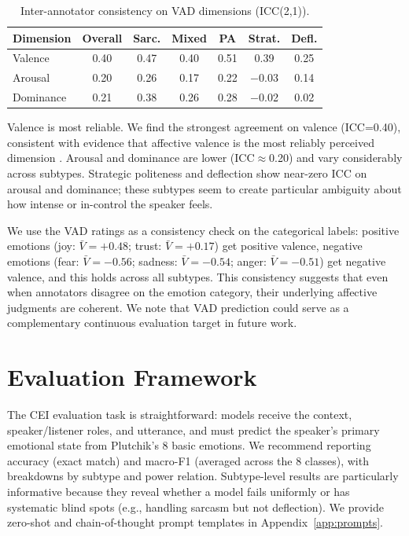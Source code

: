 \documentclass[twoside,11pt]{article}
\begin{document}
\begin{table}[t]
\centering
\caption{Inter-annotator consistency on VAD dimensions (ICC(2,1)).}
\label{tab:vad-icc}
\small
\begin{tabular}{@{}lcccccc@{}}
\toprule
\textbf{Dimension} & \textbf{Overall} & \textbf{Sarc.} & \textbf{Mixed} & \textbf{PA} & \textbf{Strat.} & \textbf{Defl.} \\
\midrule
Valence & 0.40 & 0.47 & 0.40 & 0.51 & 0.39 & 0.25 \\
Arousal & 0.20 & 0.26 & 0.17 & 0.22 & $-$0.03 & 0.14 \\
Dominance & 0.21 & 0.38 & 0.26 & 0.28 & $-$0.02 & 0.02 \\
\bottomrule
\end{tabular}
\end{table}

Valence is most reliable. We find the strongest agreement on valence (ICC=0.40), consistent with evidence that affective valence is the most reliably perceived dimension \citep{russell1980circumplex,warriner2013norms}. Arousal and dominance are lower (ICC$\approx$0.20) and vary considerably across subtypes. Strategic politeness and deflection show near-zero ICC on arousal and dominance; these subtypes seem to create particular ambiguity about how intense or in-control the speaker feels.

We use the VAD ratings as a consistency check on the categorical labels: positive emotions (joy: $\bar{V}=+0.48$; trust: $\bar{V}=+0.17$) get positive valence, negative emotions (fear: $\bar{V}=-0.56$; sadness: $\bar{V}=-0.54$; anger: $\bar{V}=-0.51$) get negative valence, and this holds across all subtypes. This consistency suggests that even when annotators disagree on the emotion category, their underlying affective judgments are coherent. We note that VAD prediction could serve as a complementary continuous evaluation target in future work.

\section{Evaluation Framework}
\label{sec:eval}

The CEI evaluation task is straightforward: models receive the context, speaker/listener roles, and utterance, and must predict the speaker's primary emotional state from Plutchik's 8 basic emotions. We recommend reporting accuracy (exact match) and macro-F1 (averaged across the 8 classes), with breakdowns by subtype and power relation. Subtype-level results are particularly informative because they reveal whether a model fails uniformly or has systematic blind spots (e.g., handling sarcasm but not deflection). We provide zero-shot and chain-of-thought prompt templates in Appendix~\ref{app:prompts}.
\end{document}
